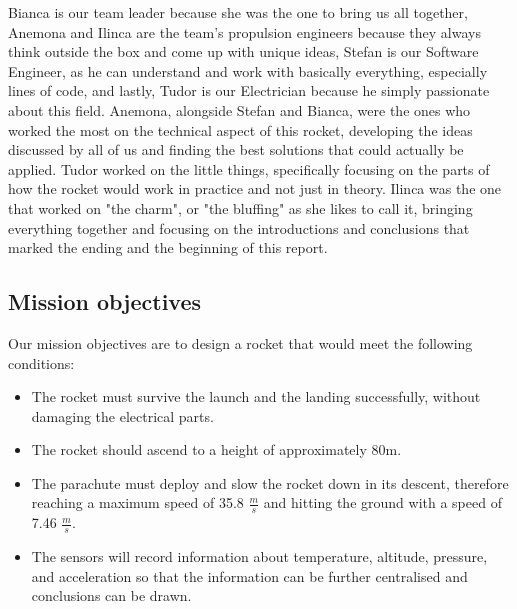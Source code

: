Bianca is our team leader because she was the one to bring us all together, Anemona and Ilinca are the team's propulsion engineers because they always think outside the box and come up with unique ideas, Stefan is our Software Engineer, as he can understand and work with basically everything, especially lines of code, and lastly, Tudor is our Electrician because he simply passionate about this field.  Anemona, alongside Stefan and Bianca, were the ones who worked the most on the technical aspect of this rocket, developing the ideas discussed by all of us and finding the best solutions that could actually be applied. Tudor worked on the little things, specifically focusing on the parts of how the rocket would work in practice and not just in theory. Ilinca was the one that worked on "the charm", or "the bluffing" as she likes to call it, bringing everything together and focusing on the introductions and conclusions that marked the ending and the beginning of this report.

\subsection{Mission objectives}

Our mission objectives are to design a rocket that would meet the following conditions:

\begin{itemize}
  \item The rocket must survive the launch and the landing successfully, without damaging the electrical parts. 
  \item The rocket should ascend to a height of approximately 80m. 
  \item The parachute must deploy and slow the rocket down in its descent, therefore reaching a maximum speed of 35.8 $ \frac{m}{s} $ and hitting the ground with a speed of 7.46 $ \frac{m}{s} $. 
  \item The sensors will record information about temperature, altitude, pressure, and acceleration so that the information can be further centralised and conclusions can be drawn.
\end{itemize}

